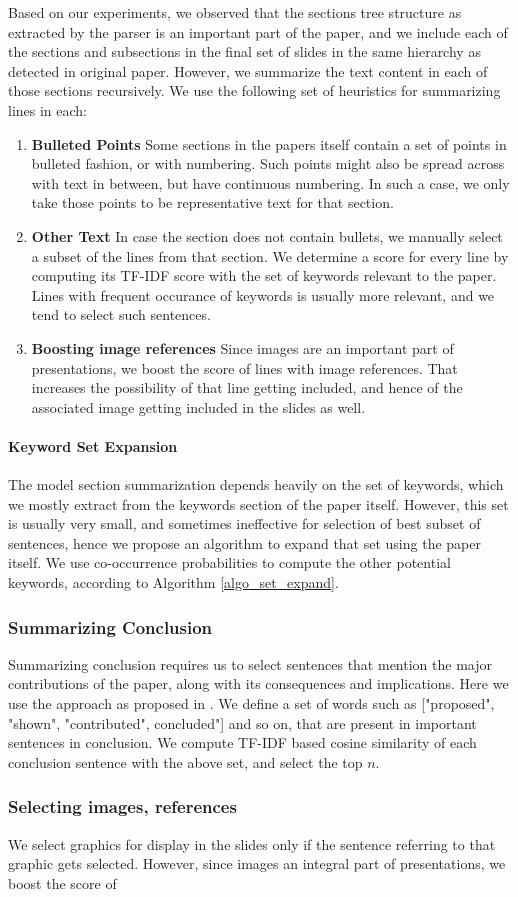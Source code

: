 Based on our experiments, we observed that the sections tree structure as extracted
by the parser is an important part of the paper, and we include each of the sections
and subsections in the final set of slides in the same hierarchy as detected
in original paper. However, we summarize the text content in each of those sections
recursively. We use the following set of heuristics for summarizing lines in each:
\begin{enumerate}
	\item \textbf{Bulleted Points} Some sections in the papers itself contain a set of
	points in bulleted fashion, or with numbering. Such points might also be spread
	across with text in between, but have continuous numbering. In such a case, we
	only take those points to be representative text for that section.
	\item \textbf{Other Text} In case the section does not contain bullets, we manually
	select a subset of the lines from that section. We determine a score for every line
	by computing its TF-IDF score with the set of keywords relevant to the paper. 
	Lines with frequent occurance of keywords is usually more relevant, and 
	we tend to select such sentences.
	\item \textbf{Boosting image references} Since images are an important 
	part of presentations, we boost the score of lines with image references.
	That increases the possibility of that line getting included, and hence 
	of the associated image getting included in the slides as well.
\end{enumerate}

\paragraph{Keyword Set Expansion}
The model section summarization depends heavily on the set of keywords, which we
mostly extract from the keywords section of the paper itself. However, this
set is usually very small, and sometimes ineffective for selection of best
subset of sentences, hence we propose an algorithm to expand that set 
using the paper itself. We use co-occurrence probabilities to compute the
other potential keywords, according to Algorithm \ref{algo_set_expand}. 


\subsubsection{Summarizing Conclusion}
Summarizing conclusion requires us to select sentences that mention the
major contributions of the paper, along with its consequences and implications.
Here we use the approach as proposed in \cite{sravanthi}. We define a set of words	
such as ["proposed", "shown", "contributed", concluded"] and so on, that 
are present in important sentences in conclusion. We compute TF-IDF based cosine similarity of
each conclusion sentence with the above set, and select the top  $n$.

\subsubsection{Selecting images, references}
We select graphics for display in the slides only if the sentence referring to that graphic
gets selected. However, since images an integral part of presentations, we boost
the score of 